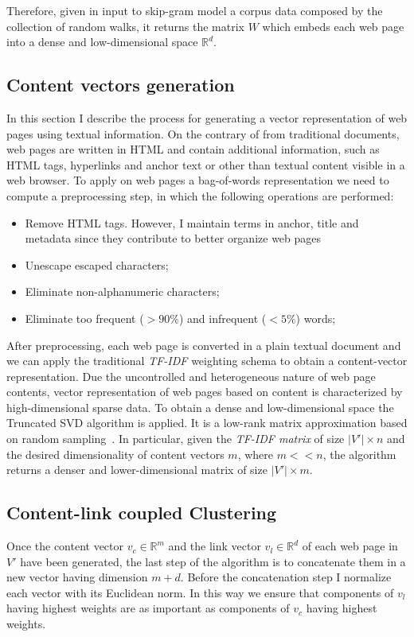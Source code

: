 Therefore, given in input to skip-gram model a corpus data composed by the collection of random walks, it returns 
the matrix $W$ which embeds each web page into a dense and low-dimensional space $\mathbb{R}^d$.%


\subsection{Content vectors generation}
In this section I describe the process for generating a vector representation of web pages using textual information. 
On the contrary of from traditional documents, web pages are written in HTML and contain additional information, such as HTML tags, hyperlinks and anchor text or other than textual content visible in a web browser. To apply on web pages a bag-of-words representation we need to compute a preprocessing step, in which the following operations are performed:
\begin{itemize}
\item Remove HTML tags. However, I maintain terms in anchor, title and metadata since they contribute to better organize web pages \cite{Fathi:2004}
\item Unescape escaped characters;
\item Eliminate non-alphanumeric characters;
\item Eliminate too frequent ($>90\%$) and infrequent ($<5\%$) words; 
\end{itemize}
After preprocessing, each web page is converted in a plain textual document and we can apply the traditional \emph{TF-IDF} weighting schema to obtain a content-vector representation.
Due the uncontrolled and heterogeneous nature of web page contents, vector representation of web pages based on content is characterized by high-dimensional sparse data. To obtain a dense and low-dimensional space the Truncated SVD algorithm is applied. It is a low-rank matrix approximation based on random sampling~\cite{Halko:2011}. In particular, given the \emph{TF-IDF matrix} of size $|V'|\times n$  and the desired dimensionality of content vectors $m$, where $m << n$, the algorithm returns a denser and lower-dimensional matrix of size $|V'|\times m$. 


\subsection{Content-link coupled Clustering}
\label{sec:Clustering}
Once the  content vector $v_c \in \mathbb{R}^m$ and the link vector $v_l \in \mathbb{R}^d$ of each web page in $V'$ have been generated, the last step of the algorithm is to concatenate them in a new vector having dimension $m+d$. Before the concatenation step I normalize each vector with its Euclidean norm. In this way we ensure that components of $v_l$ having highest weights are as important as components of $v_c$ having highest weights.

